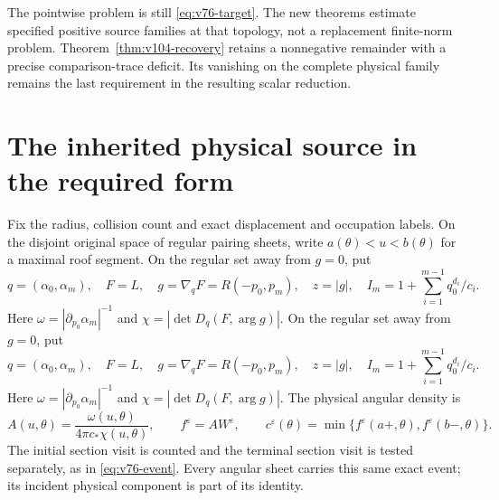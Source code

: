 \documentclass[11pt,reqno]{amsart}
\numberwithin{equation}{section}
\theoremstyle{definition}\newtheorem{definition}[theorem]{Definition}
\theoremstyle{remark}\newtheorem{remark}[theorem]{Remark}
\begin{document}
The pointwise problem is still \eqref{eq:v76-target}. The new
theorems estimate specified positive source families at that topology,
not a replacement finite-norm problem. Theorem~\ref{thm:v104-recovery}
retains a nonnegative remainder with a precise comparison-trace
deficit. Its vanishing on the complete physical family remains the
last requirement in the resulting scalar reduction.

\section{The inherited physical source in the required form}
Fix the radius, collision count and exact displacement and occupation
labels. On the disjoint original space of regular pairing sheets,
write $a(\theta)<u<b(\theta)$ for a maximal roof segment. On the regular set away from $g=0$, put
\[
 q=(\alpha_0,\alpha_m),\quad F=L,\quad
 g=\nabla_qF=R(-p_0,p_m),\quad z=|g|,\quad
 I_m=1+\sum_{i=1}^{m-1}q_0^{d_i}/c_i.
\]
Here $\omega=|\partial_{p_0}\alpha_m|^{-1}$ and
$\chi=|\det D_q(F,\arg g)|$. On the regular set away from $g=0$, put
\[
 q=(\alpha_0,\alpha_m),\quad F=L,\quad
 g=\nabla_qF=R(-p_0,p_m),\quad z=|g|,\quad
 I_m=1+\sum_{i=1}^{m-1}q_0^{d_i}/c_i.
\]
Here $\omega=|\partial_{p_0}\alpha_m|^{-1}$ and
$\chi=|\det D_q(F,\arg g)|$. The physical angular density is
\[
 A(u,\theta)=\frac{\omega(u,\theta)}{4\pi c_*\chi(u,\theta)},
 \qquad f^\varepsilon=A W^\varepsilon,
 \qquad c^\varepsilon(\theta)
     =\min\{f^\varepsilon(a+,\theta),f^\varepsilon(b-,\theta)\}.
\]
The initial section visit is counted and the terminal section visit
is tested separately, as in \eqref{eq:v76-event}. Every angular
sheet carries this same exact event; its incident physical component
is part of its identity.
\end{document}
